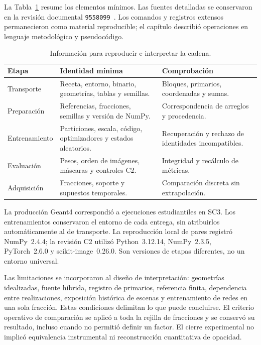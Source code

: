 La Tabla~\ref{tab:met-trazabilidad} resume los elementos mínimos. Las fuentes detalladas se conservaron en la revisión documental \texttt{9558099}~\parencite{repositorioMuografia2026}. Los comandos y registros extensos permanecieron como material reproducible; el capítulo describió operaciones en lenguaje metodológico y pseudocódigo.
\begin{table}[htbp]\centering\small
\caption{Información para reproducir e interpretar la cadena.}\label{tab:met-trazabilidad}
\begin{tabularx}{\linewidth}{@{}p{2.7cm}XX@{}}\toprule
Etapa & Identidad mínima & Comprobación\\\midrule
Transporte & Receta, entorno, binario, geometrías, tablas y semillas. & Bloques, primarios, coordenadas y sumas.\\
Preparación & Referencias, fracciones, semillas y versión de NumPy. & Correspondencia de arreglos y procedencia.\\
Entrenamiento & Particiones, escala, código, optimizadores y estados aleatorios. & Recuperación y rechazo de identidades incompatibles.\\
Evaluación & Pesos, orden de imágenes, máscaras y controles C2. & Integridad y recálculo de métricas.\\
Adquisición & Fracciones, soporte y supuestos temporales. & Comparación discreta sin extrapolación.\\\bottomrule
\end{tabularx}\end{table}
La producción Geant4 correspondió a ejecuciones estudiantiles en SC3. Los entrenamientos conservaron el entorno de cada entrega, sin atribuirlos automáticamente al de transporte. La reproducción local de pares registró NumPy~2.4.4; la revisión C2 utilizó Python~3.12.14, NumPy~2.3.5, PyTorch~2.6.0 y scikit-image~0.26.0. Son versiones de etapas diferentes, no un entorno universal.

Las limitaciones se incorporaron al diseño de interpretación: geometrías idealizadas, fuente híbrida, registro de primarios, referencia finita, dependencia entre realizaciones, exposición histórica de escenas y entrenamiento de redes en una sola fracción. Estas condiciones delimitan lo que puede concluirse. El criterio operativo de comparación se aplicó a toda la rejilla de fracciones y se conservó su resultado, incluso cuando no permitió definir un factor. El cierre experimental no implicó equivalencia instrumental ni reconstrucción cuantitativa de opacidad.
\FloatBarrier

